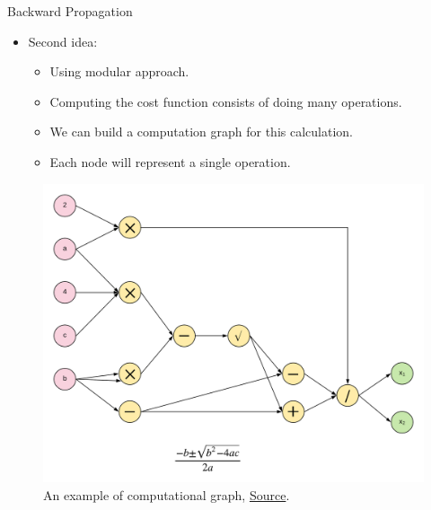 \documentclass[compress,oilve,t]{beamer}
\newcommand{\tc}[2]{
	\textcolor{#1}{\hspace{-2pt}#2\hspace{-2pt}}
}
\begin{document}
\begin{frame}{Backward Propagation}
	\begin{itemize}
		\item Second idea:
		\begin{itemize}
			\item Using \tc{keywords}{modular} approach.
			\item Computing the cost function consists of doing many operations.
			\item We can build a computation graph for this calculation.
			\item Each node will represent a single operation.
		\end{itemize}
	\end{itemize}
	\begin{figure}[H]
		\centering
		\includegraphics[height=0.5\textheight]{Figs/computational_graph.png}
		\caption{An example of computational graph, \href{https://ekababisong.org/gcp-ml-seminar/tensorflow/}{Source}.}
	\end{figure}
\end{frame}
\end{document}
